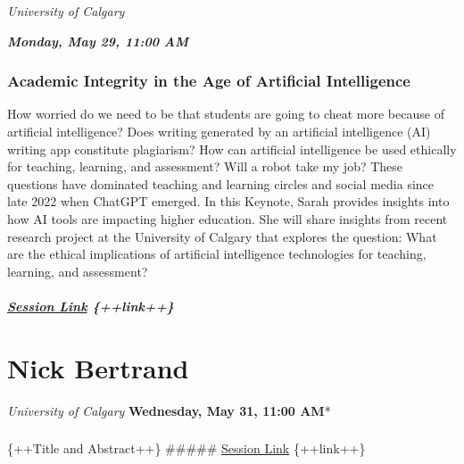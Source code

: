 \documentclass[
]{book}
\begin{document}
\emph{University of Calgary}

\textbf{\emph{Monday, May 29, 11:00 AM}}

\begin{keynote}
\hypertarget{academic-integrity-in-the-age-of-artificial-intelligence}{%
\subsubsection*{Academic Integrity in the Age of Artificial
Intelligence}\label{academic-integrity-in-the-age-of-artificial-intelligence}}

How worried do we need to be that students are going to cheat more
because of artificial intelligence? Does writing generated by an
artificial intelligence (AI) writing app constitute plagiarism? How can
artificial intelligence be used ethically for teaching, learning, and
assessment? Will a robot take my job? These questions have dominated
teaching and learning circles and social media since late 2022 when
ChatGPT emerged. In this Keynote, Sarah provides insights into how AI
tools are impacting higher education. She will share insights from
recent research project at the University of Calgary that explores the
question: What are the ethical implications of artificial intelligence
technologies for teaching, learning, and assessment?

\hypertarget{session-link-link}{%
\subparagraph{\texorpdfstring{\href{}{Session Link}
\{++link++\}}{Session Link \{++link++\}}}\label{session-link-link}}
\end{keynote}

\hypertarget{nick-bertrand}{%
\section*{Nick Bertrand}\label{nick-bertrand}}

\emph{University of Calgary
}\textbf{Wednesday, May 31, 11:00 AM}*

\begin{keynote}
\hypertarget{section}{%
\subsubsection{}\label{section}}

\{++Title and Abstract++\} \#\#\#\#\# \href{}{Session Link} \{++link++\}
\end{keynote}
\end{document}

